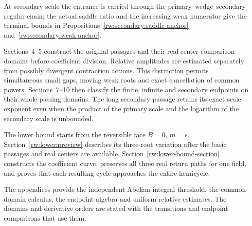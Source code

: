 At secondary scale the entrance is carried through the
primary--wedge--secondary regular chain; the actual saddle ratio
and the increasing weak numerator give the terminal bounds in
Propositions~\ref{rw:secondary:saddle-anchor}
and~\ref{rw:secondary:weak-anchor}.

Sections~4--5 construct the original passages and their real center
comparison domains before coefficient division. Relative amplitudes
are estimated separately from possibly divergent contraction actions.
This distinction permits simultaneous small gaps, moving weak roots
and exact cancellation of common powers. Sections~7--10 then classify
the finite, infinite and secondary endpoints on their whole passing
domains. The long secondary passage retains its exact scale exponent
even when the product of the primary scale and the logarithm of the
secondary scale is unbounded.

The lower bound starts from the reversible face $B=0$, $m=\epsilon$.
Section~\ref{rw:lower:preview} describes its three-root variation after
the basic passages and real centers are available.
Section~\ref{rw:lower-bound-section} constructs the coefficient curve,
preserves all three real return paths for one field, and proves that
each resulting cycle approaches the entire hemicycle.

The appendices provide the independent Abelian-integral threshold,
the common-domain calculus, the endpoint algebra and uniform relative
estimates. The domains and derivative orders are stated with the
transitions and endpoint comparisons that use them.
